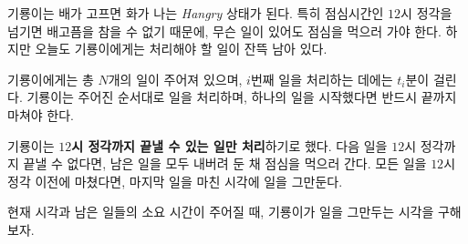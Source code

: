 기룡이는 배가 고프면 화가 나는 \textit{Hangry} 상태가 된다. 특히 점심시간인 $12$시 정각을 넘기면 배고픔을 참을 수 없기 때문에, 무슨 일이 있어도 점심을 먹으러 가야 한다.
하지만 오늘도 기룡이에게는 처리해야 할 일이 잔뜩 남아 있다.

기룡이에게는 총 $N$개의 일이 주어져 있으며, $i$번째 일을 처리하는 데에는 $t_i$분이 걸린다. 기룡이는 주어진 순서대로 일을 처리하며, 하나의 일을 시작했다면 반드시 끝까지 마쳐야 한다.

기룡이는 \textbf{$12$시 정각까지 끝낼 수 있는 일만 처리}하기로 했다. 다음 일을 $12$시 정각까지 끝낼 수 없다면, 남은 일을 모두 내버려 둔 채 점심을 먹으러 간다. 모든 일을 $12$시 정각 이전에 마쳤다면, 마지막 일을 마친 시각에 일을 그만둔다.

현재 시각과 남은 일들의 소요 시간이 주어질 때, 기룡이가 일을 그만두는 시각을 구해보자.